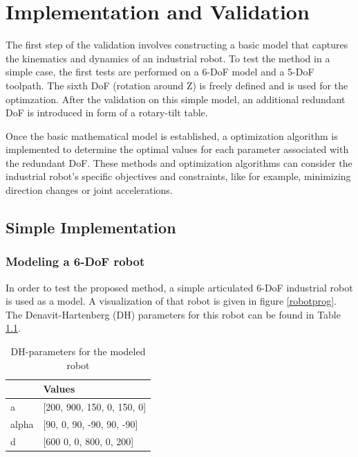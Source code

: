 \chapter{Implementation and Validation}%

The first step of the validation involves constructing a basic model that captures the kinematics and dynamics of an industrial robot. To test the method in a simple case, the first tests are performed on a 6-DoF model and a 5-DoF toolpath. The sixth DoF (rotation around Z) is freely defined and is used for the optimzation. After the validation on this simple model, an additional redundant DoF is introduced in form of a rotary-tilt table. 

Once the basic mathematical model is established, a optimization algorithm is implemented to determine the optimal values for each parameter associated with the redundant DoF. These methods and optimization algorithms can consider the industrial robot's specific objectives and constraints, like for example, minimizing direction changes or joint accelerations. 



\section{Simple Implementation}%
\subsection{Modeling a 6-DoF robot}
In order to test the proposed method, a simple articulated 6-DoF industrial robot is used as a model. A visualization of that robot is given in figure \ref{robotprog}. The Denavit-Hartenberg (DH) parameters for this robot can be found in Table \ref{DH}.

\begin{table}[H]
	\centering
	\begin{tabular}{||l|l||}
		  & Values \\
		\hline
		\hline
		\hline
		a	&		[200, 900, 150, 0,   150, 0] \\
		alpha	&  	[90,  0,   90,  -90, 90,  -90] \\
		d	& 		[600  0,   0,   800, 0,   200]\\
		
		\hline
		\hline
	\end{tabular}
	
	\caption{DH-parameters for the modeled robot}
	\label{DH}
\end{table}

